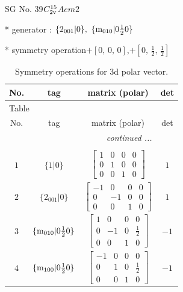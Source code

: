 \documentclass[fleqn,8pt]{jsarticle}
\begin{document}
\setcounter{MaxMatrixCols}{32}

\renewcommand{\tablename}{Table~}
\renewcommand{\figurename}{Figure~}
\begin{center}
\LARGE
SG No. 39\quad$C_{\rm 2v}^{15}$\quad$Aem2$\quad[ orthorhombic ]
\end{center}

* generator : $\{2{}_{001}|0\},\,\,\{{\rm m}_{010}|0 \frac{1}{2} 0\}$

* symmetry operation\quad$+\left[ 0,\, 0,\, 0 \right]$,\quad $+\left[ 0,\, \frac{1}{2},\, \frac{1}{2} \right]$
\renewcommand{\arraystretch}{1.3}
\begin{longtable}{cccc}
\caption{Symmetry operations for 3d polar vector.}
 \\
 \hline \hline
No. & tag & matrix (polar) & det \\ \hline \endfirsthead

\multicolumn{3}{l}{\tablename\ \thetable{}} \\
 \hline \hline
No. & tag & matrix (polar) & det \\ \hline \endhead

 \hline \hline
\multicolumn{3}{r}{\footnotesize\it continued ...} \\ \endfoot

 \hline \hline
\multicolumn{3}{r}{} \\ \endlastfoot

$ 1 $ & $ \{1|0\} $ & $ \begin{bmatrix} 1 & 0 & 0 & 0 \\ 0 & 1 & 0 & 0 \\ 0 & 0 & 1 & 0 \end{bmatrix} $ & $ 1 $ \\ \hline
$ 2 $ & $ \{2{}_{001}|0\} $ & $ \begin{bmatrix} -1 & 0 & 0 & 0 \\ 0 & -1 & 0 & 0 \\ 0 & 0 & 1 & 0 \end{bmatrix} $ & $ 1 $ \\ \hline
$ 3 $ & $ \{{\rm m}_{010}|0 \frac{1}{2} 0\} $ & $ \begin{bmatrix} 1 & 0 & 0 & 0 \\ 0 & -1 & 0 & \frac{1}{2} \\ 0 & 0 & 1 & 0 \end{bmatrix} $ & $ -1 $ \\ \hline
$ 4 $ & $ \{{\rm m}_{100}|0 \frac{1}{2} 0\} $ & $ \begin{bmatrix} -1 & 0 & 0 & 0 \\ 0 & 1 & 0 & \frac{1}{2} \\ 0 & 0 & 1 & 0 \end{bmatrix} $ & $ -1 $ \\
\end{longtable}
\end{document}
